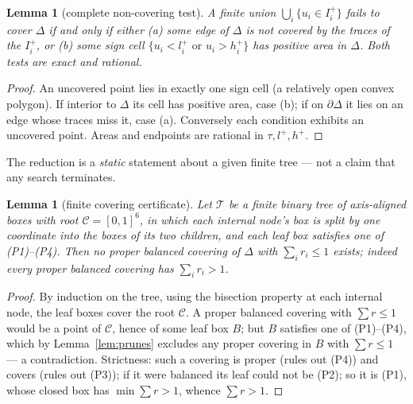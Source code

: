 \documentclass[11pt,reqno]{amsart}
\theoremstyle{plain}
\newtheorem{lemma}[theorem]{Lemma}
\theoremstyle{definition}
\theoremstyle{remark}
\begin{document}
\begin{lemma}[complete non-covering test]\label{lem:noncover}
A finite union $\bigcup_i\{u_i\in I_i^+\}$ fails to cover $\Delta$ if and only
if either \textup{(a)} some edge of $\Delta$ is not covered by the traces of
the $I_i^+$, or \textup{(b)} some sign cell $\{u_i<l_i^+\text{ or }u_i>h_i^+\}$
has positive area in $\Delta$. Both tests are exact and rational.
\end{lemma}
\begin{proof}
An uncovered point lies in exactly one sign cell (a relatively open convex
polygon). If interior to $\Delta$ its cell has positive area, case (b); if on
$\partial\Delta$ it lies on an edge whose traces miss it, case (a).
Conversely each condition exhibits an uncovered point. Areas and endpoints are
rational in $\tau,l^+,h^+$.
\end{proof}

The reduction is a \emph{static} statement about a given finite tree --- not a
claim that any search terminates.

\begin{lemma}[finite covering certificate]\label{lem:reduction}
Let $\mathcal T$ be a finite binary tree of axis-aligned boxes with root
$\mathcal C=[0,1]^6$, in which each internal node's box is split by one
coordinate into the boxes of its two children, and each leaf box satisfies one
of \textup{(P1)--(P4)}. Then no proper balanced covering of $\Delta$ with
$\sum_i r_i\le1$ exists; indeed every proper balanced covering has
$\sum_i r_i>1$.
\end{lemma}
\begin{proof}
By induction on the tree, using the bisection property at each internal node,
the leaf boxes cover the root $\mathcal C$. A proper balanced covering with
$\sum r\le1$ would be a point of $\mathcal C$, hence of some leaf box $B$; but
$B$ satisfies one of (P1)--(P4), which by Lemma~\ref{lem:prunes} excludes any
proper covering in $B$ with $\sum r\le1$ --- a contradiction. Strictness: such
a covering is proper (rules out (P4)) and covers (rules out (P3)); if it were
balanced its leaf could not be (P2); so it is (P1), whose closed box has
$\min\sum r>1$, whence $\sum r>1$.
\end{proof}
\end{document}
